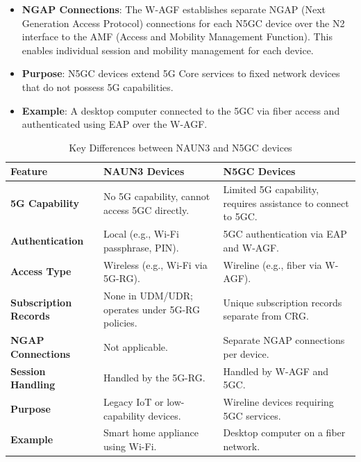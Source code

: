 \begin{itemize}
{\begin{itemize}
{            }
            \item {
                \textbf{NGAP Connections}: The W-AGF establishes separate NGAP (Next Generation Access Protocol) connections for each N5GC device over the N2 interface to the AMF (Access and Mobility Management Function). This enables individual session and mobility management for each device.
            }
            \item {
                \textbf{Purpose}: N5GC devices extend 5G Core services to fixed network devices that do not possess 5G capabilities.
            }
            \item {
                \textbf{Example}: A desktop computer connected to the 5GC via fiber access and authenticated using EAP over the W-AGF.
            }
        \end{itemize}    
    }
\end{itemize}

\begin{table}[ht]
    \centering
    \caption{Key Differences between NAUN3 and N5GC devices}
    \label{tab:Key Differences between NAUN3 and N5GC devices}
    \begin{tabularx}{\textwidth} { 
      | >{\raggedright\arraybackslash}X 
      | >{\raggedright\arraybackslash}X 
      | >{\raggedright\arraybackslash}X | }
        \hline
        \textbf{Feature} & \textbf{NAUN3 Devices} & \textbf{N5GC Devices} \\
        \hline
        \textbf{5G Capability} & No 5G capability, cannot access 5GC directly. & Limited 5G capability, requires assistance to connect to 5GC.\\
        \hline
        \textbf{Authentication} & Local (e.g., Wi-Fi passphrase, PIN). & 5GC authentication via EAP and W-AGF.\\
        \hline
        \textbf{Access Type} & Wireless (e.g., Wi-Fi via 5G-RG). & Wireline (e.g., fiber via W-AGF).\\
        \hline
        \textbf{Subscription Records} & None in UDM/UDR; operates under 5G-RG policies. & Unique subscription records separate from CRG.\\
        \hline
        \textbf{NGAP Connections} & Not applicable. & Separate NGAP connections per device.\\
        \hline
        \textbf{Session Handling} & Handled by the 5G-RG. & Handled by W-AGF and 5GC.\\
        \hline
        \textbf{Purpose} & Legacy IoT or low-capability devices. & Wireline devices requiring 5GC services.\\
        \hline
        \textbf{Example} & Smart home appliance using Wi-Fi. & Desktop computer on a fiber network.\\
        \hline
    \end{tabularx}
\end{table}


